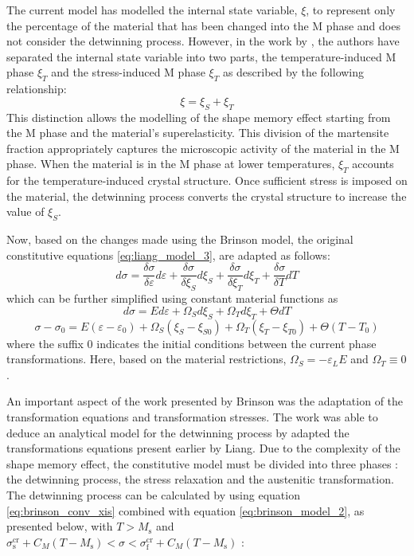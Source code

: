 The current model has modelled the internal state variable, $\xi$, to represent only the percentage of the material that has been changed into the M phase and does not consider the detwinning process. However, in the work by \cite{brinsonOneDimensionalConstitutiveBehavior1993}, the authors have separated the internal state variable into two parts, the temperature-induced M phase $\xi_T$ and the stress-induced M phase $\xi_T$ as described by the following relationship:
\begin{equation}
  \label{eq:xis-xit}
  \xi = \xi_S + \xi_T
\end{equation}
This distinction allows the modelling of the shape memory effect starting from the M phase and the material's superelasticity. This division of the martensite fraction appropriately captures the microscopic activity of the material in the M phase. When the material is in the M phase at lower temperatures, $\xi_T$ accounts for the temperature-induced crystal structure. Once sufficient stress is imposed on the material, the detwinning process converts the crystal structure to increase the value of $\xi_S$.

Now, based on the changes made using the Brinson model, the original constitutive equations \cref{eq:liang_model_3}, are adapted as follows:
\begin{equation}
  \label{eq:brinson_model_1}
  d\sigma = \frac{\delta\sigma}{\delta\varepsilon}d\varepsilon + \frac{\delta\sigma}{\delta\xi_S}d\xi_S + \frac{\delta\sigma}{\delta\xi_T}d\xi_T + \frac{\delta\sigma}{\delta T}dT
\end{equation}
 which can be further simplified using constant material functions as
\begin{equation}
  \label{eq:brinson_model_2}
  d\sigma = Ed\varepsilon + \Omega_Sd\xi_S + \Omega_Td\xi_T + \Theta dT
\end{equation}
\begin{equation}
  \label{eq:brinson_model_3}
  \sigma-\sigma_0 = E(\varepsilon-\varepsilon_0) + \Omega_S(\xi_S-\xi_{S0}) + \Omega_T(\xi_T-\xi_{T0}) + \Theta (T-T_0)
\end{equation}
where the suffix $0$ indicates the initial conditions between the current phase transformations. Here, based on the material restrictions, $\Omega_S=-\varepsilon_L E$ and $\Omega_T\equiv0$.

An important aspect of the work presented by Brinson was the adaptation of the transformation equations and transformation stresses. The work was able to deduce an analytical model for the detwinning process by adapted the transformations equations present earlier by Liang. Due to the complexity of the shape memory effect, the constitutive model must be divided into three phases : the detwinning process, the stress relaxation and the austenitic transformation. The detwinning process can be calculated by using equation \ref{eq:brinson_conv_xis} combined with equation \ref{eq:brinson_model_2}, as presented below, with $T > M_\mathrm{s}$ and $\sigma_\mathrm{s}^\mathrm{cr} + C_M(T - M_\mathrm{s}) < \sigma < \sigma_\mathrm{f}^\mathrm{cr} + C_M(T-M_\mathrm{s})$ :

